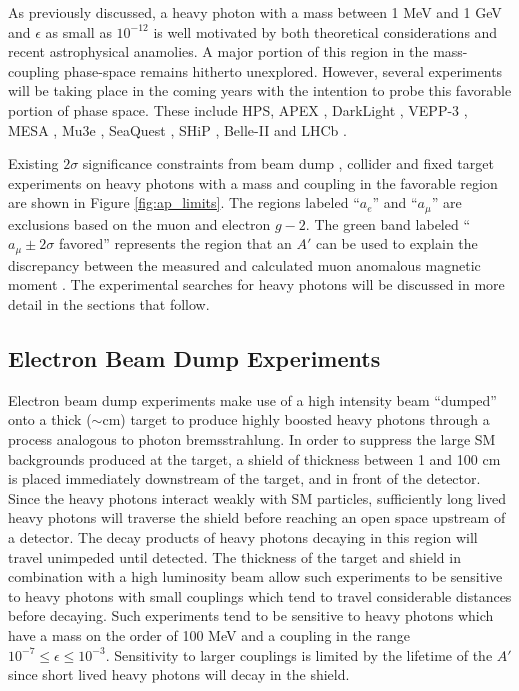 As previously discussed, a heavy photon with a mass between 1 MeV and 1 GeV and
$\epsilon$ as small as $10^{-12}$ is well motivated by both theoretical
considerations and recent astrophysical anamolies.  A major portion of this
region in the mass-coupling phase-space remains hitherto unexplored. However,
several experiments will be taking place in the coming years with the intention
to probe this favorable portion of phase space. These include HPS, APEX \cite{Essig:2010xa}, 
DarkLight \cite{Freytsis:2009bh}, VEPP-3 \cite{Wojtsekhowski:2012zq},
MESA \cite{Beranek:2013yqa}, Mu3e \cite{Echenard:2014lma}, 
SeaQuest \cite{Gardner:2015wea}, SHiP \cite{Alekhin:2015byh}, Belle-II and 
LHCb \cite{Ilten:2016tkc, Ilten:2015hya}.

Existing $2\sigma$ significance constraints
from beam dump \cite{Bjorken:1988as, riordan1987, bross1991, konaka1986,
                     davier1989, Bjorken:2009mm, andreas2012, Blumlein:1990ay,
                     Blumlein:1991xh, johannes2011, johannes2014},  
collider \cite{Reece:2009un, Aubert:2009cp, Babusci:2012cr, Archilli:2011zc} 
and fixed target experiments \cite{Abrahamyan:2011gv, Merkel:2014avp,
                                   Agakishiev:2013fwl, Batley:2015lha}
on heavy photons with a mass and coupling in the favorable region are shown 
in Figure \ref{fig:ap_limits}. The regions labeled ``$a_e$'' and ``$a_\mu$'' 
are exclusions based on the muon and electron $g-2$.
The green band labeled ``$a_{\mu} \pm 2\sigma$ favored'' represents the region
that an $A'$ can be used to explain the discrepancy  between the measured and
calculated muon anomalous magnetic moment \cite{Pospelov:2008zw, Bennett:2006fi}.
The experimental searches for heavy photons will be discussed in more detail
in the sections that follow.

\subsection{Electron Beam Dump Experiments}

Electron beam dump experiments make use of a high intensity beam ``dumped'' onto
a thick ($\sim$cm) target to produce highly boosted heavy photons through a 
process analogous to photon bremsstrahlung.  In order to suppress the large
SM backgrounds produced at the target, a shield of thickness between 1 and 
100 cm
is placed immediately downstream of the target, and in front of the detector.  Since the 
heavy photons interact weakly with SM particles, sufficiently long lived 
heavy photons will traverse the shield before reaching an open space upstream
of a detector.  The decay products of heavy photons decaying in this region 
will travel unimpeded until detected.
The thickness of the target and shield in combination with a high luminosity
beam allow such experiments to be sensitive to heavy photons with small 
couplings which tend to travel considerable distances before decaying. Such 
experiments tend to be sensitive to heavy photons which have a mass on the order
of 100 MeV and a coupling in the range $10^{-7} \le \epsilon \le 10^{-3}$.  
Sensitivity to larger couplings is limited by the lifetime of the $A'$ since
short lived heavy photons will decay in the shield.

